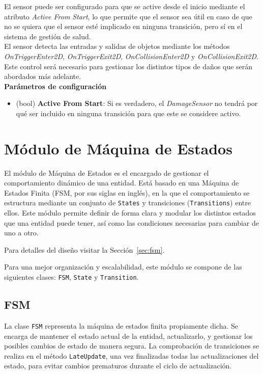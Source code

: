 El sensor puede ser configurado para que se active desde el inicio mediante el atributo \textit{Active From Start}, lo que permite que el sensor sea útil en caso de que no se quiera que el sensor esté implicado en ninguna transición, pero sí en el sistema de gestión de salud.\\

El sensor detecta las entradas y salidas de objetos mediante los métodos \textit{OnTriggerEnter2D}, \textit{OnTriggerExit2D}, \textit{OnCollisionEnter2D} y \textit{OnCollisionExit2D}. Este control será necesario para gestionar los distintos tipos de daños que serán abordados más adelante.\\

\textbf{Parámetros de configuración}
\begin{itemize}
	\item (bool) \textbf{Active From Start}: Si es verdadero, el \textit{DamageSensor} no tendrá por qué ser incluido en ninguna transición para que este se considere activo.
\end{itemize}

\section{Módulo de Máquina de Estados}

El módulo de Máquina de Estados es el encargado de gestionar el comportamiento dinámico de una entidad. Está basado en una Máquina de Estados Finita (FSM, por sus siglas en inglés), en la que el comportamiento se estructura mediante un conjunto de \texttt{States} y transiciones (\texttt{Transitions}) entre ellos. Este módulo permite definir de forma clara y modular los distintos estados que una entidad puede tener, así como las condiciones necesarias para cambiar de uno a otro. 

Para detalles del diseño visitar la Sección~\ref{sec:fsm}.

Para una mejor organización y escalabilidad, este módulo se compone de las siguientes clases: \texttt{FSM}, \texttt{State} y \texttt{Transition}. 

\subsection{FSM}

La clase \texttt{FSM} representa la máquina de estados finita propiamente dicha. Se encarga de mantener el estado actual de la entidad, actualizarlo, y gestionar los posibles cambios de estado de manera segura. La comprobación de transiciones se realiza en el método \texttt{LateUpdate}, una vez finalizadas todas las actualizaciones del estado, para evitar cambios prematuros durante el ciclo de actualización.

